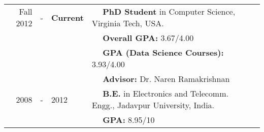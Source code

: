 
  \tabcolsep=0.11cm
  \begin{tabular}{rclll}
    Fall 2012 & - &{\bf Current} & $\quad$ {\bf PhD Student} in Computer Science, Virginia Tech, USA. \\
                & & & $\quad$ \textbf{Overall GPA:} 3.67/4.00\\
                & & & $\quad$ \textbf{GPA (Data Science Courses):} 3.93/4.00\\
                & & & $\quad$ \textbf{Advisor:} Dr. Naren Ramakrishnan \\
    2008 & - & 2012 & $\quad$ {\bf B.E.} in Electronics and Telecomm. Engg., Jadavpur University, India. \\
        & & & $\quad$ \textbf{GPA:} 8.95/10\\
  \end{tabular}


